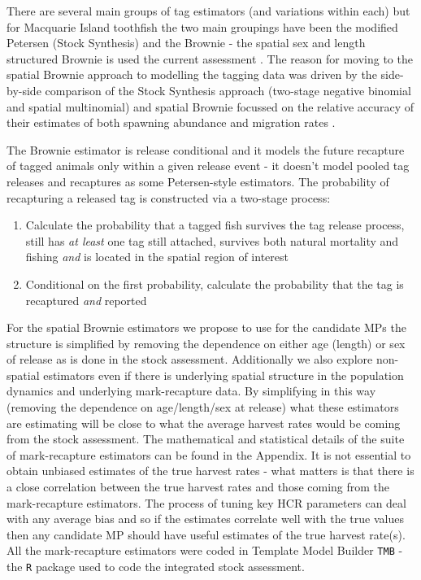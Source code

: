 \documentclass[12pt,a4paper,twoside,times,sky,standard]{csiroreport2017}
\begin{document}
There are several main groups of tag estimators (and variations within each) but for Macquarie Island toothfish the two main groupings have been the modified Petersen (Stock Synthesis) and the Brownie - the spatial sex and length structured Brownie is used the current assessment \cite{revass2019}. The reason for moving to the spatial Brownie approach to modelling the tagging data was driven by the side-by-side comparison of the Stock Synthesis approach (two-stage negative binomial and spatial multinomial) and spatial Brownie focussed on the relative accuracy of their estimates of both spawning abundance and migration rates \cite{tagdes}.

The Brownie estimator is release conditional and it models the future recapture of tagged animals only within a given release event - it doesn't model pooled tag releases and recaptures as some Petersen-style estimators. The probability of recapturing a released tag is constructed via a two-stage process:

\begin{enumerate}
    \item Calculate the probability that a tagged fish survives the tag release process, still has \emph{at least} one tag still attached, survives both natural mortality and fishing \emph{and} is located in the spatial region of interest
    \item Conditional on the first probability, calculate the probability that the tag is recaptured \emph{and} reported
\end{enumerate}

For the spatial Brownie estimators we propose to use for the candidate MPs the structure is simplified by removing the dependence on either age (length) or sex of release as is done in the stock assessment. Additionally we also explore non-spatial estimators even if there is underlying spatial structure in the population dynamics and underlying mark-recapture data. By simplifying in this way (removing the dependence on age/length/sex at release) what these estimators are estimating will be close to what the average harvest rates would be coming from the stock assessment. The mathematical and statistical details of the suite of mark-recapture estimators can be found in the Appendix. It is not essential to obtain unbiased estimates of the true harvest rates - what matters is that there is a close correlation between the true harvest rates and those coming from the mark-recapture estimators. The process of tuning key HCR parameters can deal with any average bias and so if the estimates correlate well with the true values then any candidate MP should have useful estimates of the true harvest rate(s). All the mark-recapture estimators were coded in Template Model Builder \texttt{TMB} \cite{tmb} - the \texttt{R} package used to code the integrated stock assessment.
\end{document}
